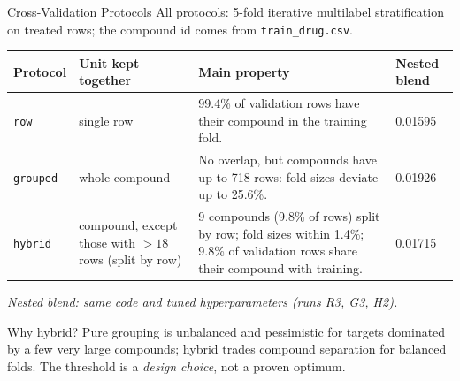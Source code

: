 \documentclass[aspectratio=169,10pt]{beamer}
\newcommand{\smallnote}[1]{{\tiny\textit{#1}}}
\begin{document}
\begin{frame}{Cross-Validation Protocols}
\small
All protocols: 5-fold iterative multilabel stratification~\cite{strat,itstrat} on treated rows; the compound id comes from \texttt{train\_drug.csv}.
\vspace{0.3em}

\begin{tabular}{p{} p{} p{} p{}}
\toprule
\textbf{Protocol} & \textbf{Unit kept together} & \textbf{Main property} & \textbf{Nested blend}\\
\midrule
\texttt{row} & single row & 99.4\% of validation rows have their compound in the training fold. & 0.01595\\
\texttt{grouped} & whole compound & No overlap, but compounds have up to 718 rows: fold sizes deviate up to 25.6\%. & 0.01926\\
\texttt{hybrid} & compound, except those with $>18$ rows (split by row) & 9 compounds (9.8\% of rows) split by row; fold sizes within 1.4\%; 9.8\% of validation rows share their compound with training. & 0.01715\\
\bottomrule
\end{tabular}
\smallnote{Nested blend: same code and tuned hyperparameters (runs R3, G3, H2).}
\vspace{0.4em}
\begin{block}{Why hybrid?}
Pure grouping is unbalanced and pessimistic for targets dominated by a few very large compounds; hybrid trades compound separation for balanced folds. The threshold is a \emph{design choice}, not a proven optimum.
\end{block}
\end{frame}
\end{document}
